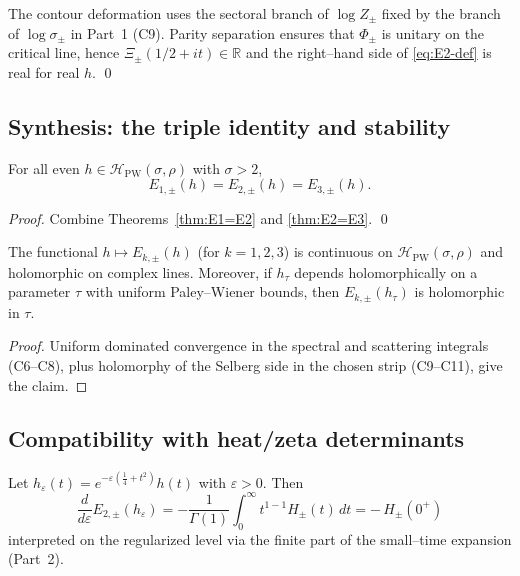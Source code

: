 \begin{remark}
\label{rem:branch-parity}
The contour deformation uses the sectoral branch of $\log Z_\pm$ fixed by the branch of $\log\sigma_\pm$ in Part~1 (C9). Parity separation ensures that $\Phi_\pm$ is unitary on the critical line, hence $\Xi_\pm(1/2+it)\in\mathbb R$ and the right–hand side of \eqref{eq:E2-def} is real for real $h$. \qed %
\end{remark}


\subsection{Synthesis: the triple identity and stability}
\label{subsec:ch6-part3-synthesis} \relax \hspace{0pt}
\begin{theorem}
\label{thm:triple}
For all even $h\in\mathcal H_{\mathrm{PW}}(\sigma,\rho)$ with $\sigma>2$,
\[
E_{1,\pm}(h)=E_{2,\pm}(h)=E_{3,\pm}(h).
\]
\end{theorem}

\begin{proof}
Combine Theorems~\ref{thm:E1=E2} and \ref{thm:E2=E3}. \qed %
\end{proof}

\begin{proposition}
\label{prop:stability-h}
The functional $h\mapsto E_{k,\pm}(h)$ (for $k=1,2,3$) is continuous on $\mathcal H_{\mathrm{PW}}(\sigma,\rho)$ and holomorphic on complex lines. Moreover, if $h_\tau$ depends holomorphically on a parameter $\tau$ with uniform Paley–Wiener bounds, then $E_{k,\pm}(h_\tau)$ is holomorphic in $\tau$.
\end{proposition}

\begin{proof}
Uniform dominated convergence in the spectral and scattering integrals (C6–C8), plus holomorphy of the Selberg side in the chosen strip (C9–C11), give the claim.  %
\end{proof}


\subsection{Compatibility with heat/zeta determinants}
\label{subsec:ch6-part3-dets} \relax \hspace{0pt}
\begin{lemma}
\label{lem:window}
Let $h_\varepsilon(t)=e^{-\varepsilon(\frac14+t^2)}h(t)$ with $\varepsilon>0$. Then
\[
\frac{d}{d\varepsilon}E_{2,\pm}(h_\varepsilon)
= -\frac{1}{\Gamma(1)}\int_0^\infty t^{1-1}H_\pm(t)\,dt
= -\,H_\pm(0^+)
\]
interpreted on the regularized level via the finite part of the small–time expansion (Part~2). 
\end{lemma}

